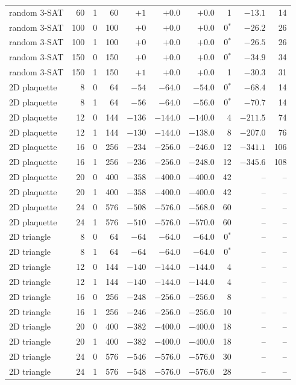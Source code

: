\begin{tabular}{lrrr r rrr rr}
random 3-SAT & 60 & 1 & 60 & $+1$ & $+0.0$ & $+0.0$ & 1 & $-13.1$ & 14 \\
random 3-SAT & 100 & 0 & 100 & $+0$ & $+0.0$ & $+0.0$ & 0$^*$ & $-26.2$ & 26 \\
random 3-SAT & 100 & 1 & 100 & $+0$ & $+0.0$ & $+0.0$ & 0$^*$ & $-26.5$ & 26 \\
random 3-SAT & 150 & 0 & 150 & $+0$ & $+0.0$ & $+0.0$ & 0$^*$ & $-34.9$ & 34 \\
random 3-SAT & 150 & 1 & 150 & $+1$ & $+0.0$ & $+0.0$ & 1 & $-30.3$ & 31 \\
2D plaquette & 8 & 0 & 64 & $-54$ & $-64.0$ & $-54.0$ & 0$^*$ & $-68.4$ & 14 \\
2D plaquette & 8 & 1 & 64 & $-56$ & $-64.0$ & $-56.0$ & 0$^*$ & $-70.7$ & 14 \\
2D plaquette & 12 & 0 & 144 & $-136$ & $-144.0$ & $-140.0$ & 4 & $-211.5$ & 74 \\
2D plaquette & 12 & 1 & 144 & $-130$ & $-144.0$ & $-138.0$ & 8 & $-207.0$ & 76 \\
2D plaquette & 16 & 0 & 256 & $-234$ & $-256.0$ & $-246.0$ & 12 & $-341.1$ & 106 \\
2D plaquette & 16 & 1 & 256 & $-236$ & $-256.0$ & $-248.0$ & 12 & $-345.6$ & 108 \\
2D plaquette & 20 & 0 & 400 & $-358$ & $-400.0$ & $-400.0$ & 42 & -- & -- \\
2D plaquette & 20 & 1 & 400 & $-358$ & $-400.0$ & $-400.0$ & 42 & -- & -- \\
2D plaquette & 24 & 0 & 576 & $-508$ & $-576.0$ & $-568.0$ & 60 & -- & -- \\
2D plaquette & 24 & 1 & 576 & $-510$ & $-576.0$ & $-570.0$ & 60 & -- & -- \\
2D triangle & 8 & 0 & 64 & $-64$ & $-64.0$ & $-64.0$ & 0$^*$ & -- & -- \\
2D triangle & 8 & 1 & 64 & $-64$ & $-64.0$ & $-64.0$ & 0$^*$ & -- & -- \\
2D triangle & 12 & 0 & 144 & $-140$ & $-144.0$ & $-144.0$ & 4 & -- & -- \\
2D triangle & 12 & 1 & 144 & $-140$ & $-144.0$ & $-144.0$ & 4 & -- & -- \\
2D triangle & 16 & 0 & 256 & $-248$ & $-256.0$ & $-256.0$ & 8 & -- & -- \\
2D triangle & 16 & 1 & 256 & $-246$ & $-256.0$ & $-256.0$ & 10 & -- & -- \\
2D triangle & 20 & 0 & 400 & $-382$ & $-400.0$ & $-400.0$ & 18 & -- & -- \\
2D triangle & 20 & 1 & 400 & $-382$ & $-400.0$ & $-400.0$ & 18 & -- & -- \\
2D triangle & 24 & 0 & 576 & $-546$ & $-576.0$ & $-576.0$ & 30 & -- & -- \\
2D triangle & 24 & 1 & 576 & $-548$ & $-576.0$ & $-576.0$ & 28 & -- & -- \\
\bottomrule
\end{tabular}
